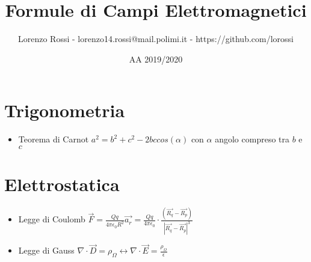 \documentclass{article}
\title{Formule di Campi Elettromagnetici}
\author{Lorenzo Rossi - lorenzo14.rossi@mail.polimi.it - https://github.com/lorossi}
\date{AA 2019/2020}
\begin{document}
\maketitle

\section{Trigonometria}
\begin{itemize}
	\item Teorema di Carnot \( a^2 = b^2 + c^2 - 2bccos(\alpha)\) con \(\alpha\) angolo compreso tra \(b\) e \(c\) 
\end{itemize}

\section{Elettrostatica}
\begin{itemize}
	\item Legge di Coulomb \( \vec{F} = \frac{Qq}{4 \pi \epsilon_0 R^2} \vec{a_r} = \frac{Qq}{4 \pi \epsilon_0} \cdot \frac{(\vec{R_q} - \vec{R_p})}{| \vec{R_q} - \vec{R_p} | ^3 } \)
	\item Legge di Gauss \( \nabla \cdot \vec{D} = \rho_\Omega \leftrightarrow \nabla \cdot \vec{E} = \frac{\rho_\Omega}{\epsilon} \)
\end{itemize}
\end{document}
